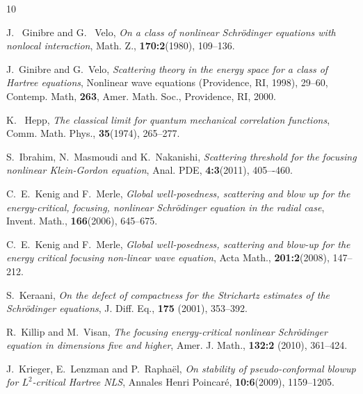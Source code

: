 \documentclass[reqno, 11pt]{amsart}
\numberwithin{equation}{section}
\theoremstyle{plain}
\theoremstyle{definition}
\numberwithin{equation}{section}
\numberwithin{theorem}{section}
\numberwithin{equation}{section}
\numberwithin{equation}{section}
\numberwithin{theorem}{section}
\begin{document}
\begin{thebibliography}{10}
		
		J. ~Ginibre and G. ~Velo, \emph{On a class of nonlinear Schr\"{o}dinger equations with nonlocal interaction}, Math. Z., \textbf{170:2}(1980), 109--136.
		
		J.~Ginibre and G.~Velo, \emph{Scattering theory in the energy space for a class of Hartree equations}, Nonlinear wave equations (Providence, RI, 1998), 29--60, Contemp. Math, \textbf{263}, Amer. Math. Soc., Providence, RI, 2000.
		
		
		K. ~Hepp, \emph{The classical limit for quantum mechanical correlation functions}, Comm. Math. Phys., \textbf{35}(1974), 265--277.
		
		S.~Ibrahim, N.~Masmoudi and K.~Nakanishi, \emph{Scattering threshold for the focusing nonlinear Klein-Gordon equation},  Anal. PDE, \textbf{4:3}(2011), 405–-460.
		
		
		C.~E.~Kenig and F.~Merle, \emph{Global well-posedness, scattering and blow up for the energy-critical, focusing, nonlinear Schr\"odinger equation in the radial case}, Invent. Math., \textbf{166}(2006), 645--675.
		
		C.~E.~Kenig and F.~Merle, \emph{Global well-posedness, scattering and blow-up for the energy critical focusing non-linear wave equation}, Acta Math., \textbf{201:2}(2008), 147--212.
		
		S.~Keraani, \emph{On the defect of compactness for the Strichartz estimates of the Schr\"odinger equations}, J. Diff. Eq., \textbf{175} (2001), 353--392.
		
		R.~Killip and M.~Visan, \emph{The focusing energy-critical nonlinear Schr\"odinger equation in dimensions five and higher}, Amer. J. Math., \textbf{132:2} (2010), 361--424.
		
		J.~Krieger, E.~Lenzman and P.~Rapha\"{e}l, \emph{On stability of pseudo-conformal blowup for $L^2$-critical Hartree NLS}, Annales Henri Poincar\'{e}, \textbf{10:6}(2009), 1159--1205.
		

\end{thebibliography}
\end{document}
